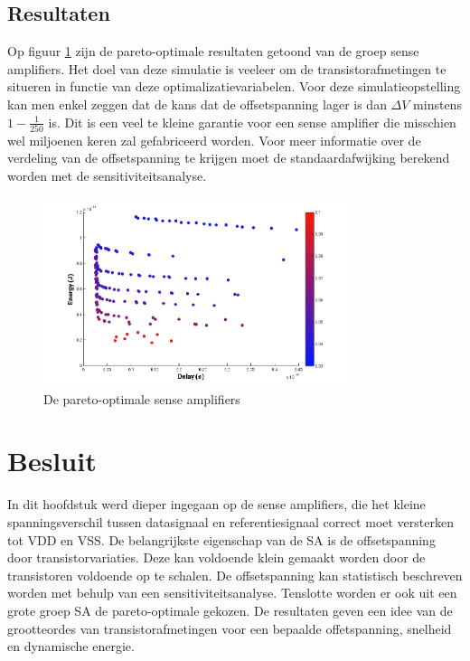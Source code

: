 \subsection{Resultaten}
Op figuur \ref{fig:pareto} zijn de pareto-optimale resultaten getoond van de groep sense amplifiers. Het doel van deze simulatie is veeleer om de transistorafmetingen te situeren in functie van deze optimalizatievariabelen. Voor deze simulatieopstelling kan men enkel zeggen dat de kans dat de offsetspanning lager is dan $\Delta V$ minstens $1 -\frac{1}{250}$ is. Dit is een veel te kleine garantie voor een sense amplifier die misschien wel miljoenen keren zal gefabriceerd worden. Voor meer informatie over de verdeling van de offsetspanning te krijgen moet de standaardafwijking berekend worden met de sensitiviteitsanalyse.

\begin{figure}
  \centering
  \includegraphics[width=0.8\textwidth]{../fig/hfdstk-sensamp-pareto2.png}
  \caption{De pareto-optimale sense amplifiers}
  \label{fig:pareto}
\end{figure}

\section{Besluit}
In dit hoofdstuk werd dieper ingegaan op de sense amplifiers, die het kleine spanningsverschil tussen datasignaal en referentiesignaal correct moet versterken tot VDD en VSS. De belangrijkste eigenschap van de SA is de offsetspanning door transistorvariaties. Deze kan voldoende klein gemaakt worden door de transistoren voldoende op te schalen. De offsetspanning kan statistisch beschreven worden met behulp van een sensitiviteitsanalyse. Tenslotte worden er ook uit een grote groep SA de pareto-optimale gekozen. De resultaten geven een idee van de grootteordes van transistorafmetingen voor een bepaalde offetspanning, snelheid en dynamische energie.
